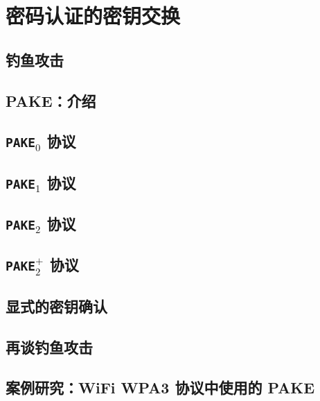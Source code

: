 \section{密码认证的密钥交换}\label{sec:21-11}

\subsection{钓鱼攻击}\label{subsec:21-11-1}

\subsection{PAKE：介绍}\label{subsec:21-11-2}

\subsection{\texttt{PAKE$_0$} 协议}\label{subsec:21-11-3}

\subsection{\texttt{PAKE$_1$} 协议}\label{subsec:21-11-4}

\subsection{\texttt{PAKE$_2$} 协议}\label{subsec:21-11-5}

\begin{lemma}\label{lemma:21-7}
	
\end{lemma}

\begin{lemma}\label{lemma:21-8}
	
\end{lemma}

\subsection{\texttt{PAKE$_2^+$} 协议}\label{subsec:21-11-6}

\subsection{显式的密钥确认}\label{subsec:21-11-7}

\subsection{再谈钓鱼攻击}\label{subsec:21-11-8}

\subsection{案例研究：WiFi WPA3 协议中使用的 PAKE}\label{subsec:21-11-9}
